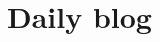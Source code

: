 \documentclass[pre,preprint,groupedaddress,showpacs,showkeys]{revtex4}
\begin{document}

\newpage
% 
% 


\ifboyscout
\newpage
\section{Daily blog}
\label{sect-DailyBlog}
\end{document}
